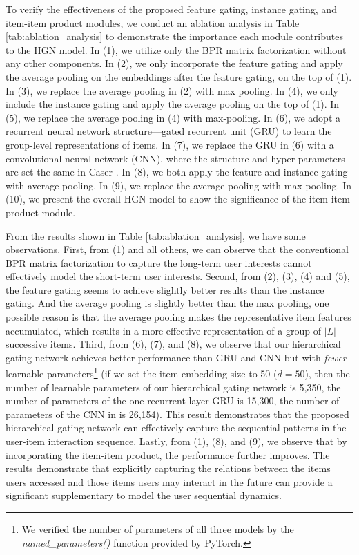 \documentclass[sigconf]{acmart}
\begin{document}
To verify the effectiveness of the proposed feature gating, instance gating, and item-item product modules, we conduct an ablation analysis in Table \ref{tab:ablation_analysis} to demonstrate the importance each module contributes to the HGN model. In (1), we utilize only the BPR matrix factorization without any other components. In (2), we only incorporate the feature gating and apply the average pooling on the embeddings after the feature gating, on the top of (1). In (3), we replace the average pooling in (2) with max pooling. In (4), we only include the instance gating and apply the average pooling on the top of (1). In (5), we replace the average pooling in (4) with max-pooling. In (6), we adopt a recurrent neural network structure---gated recurrent unit (GRU) \cite{DBLP:conf/emnlp/ChoMGBBSB14} to learn the group-level representations of items. In (7), we replace the GRU in (6) with a convolutional neural network (CNN), where the structure and hyper-parameters are set the same in Caser \cite{DBLP:conf/wsdm/TangW18}. In (8), we both apply the feature and instance gating with average pooling. In (9), we replace the average pooling with max pooling. In (10), we present the overall HGN model to show the significance of the item-item product module.

From the results shown in Table \ref{tab:ablation_analysis}, we have some observations. First, from (1) and all others, we can observe that the conventional BPR matrix factorization to capture the long-term user interests cannot effectively model the short-term user interests. Second, from (2), (3), (4) and (5), the feature gating seems to achieve slightly better results than the instance gating. And the average pooling is slightly better than the max pooling, one possible reason is that the average pooling makes the representative item features accumulated, which results in a more effective representation of a group of $ |L| $ successive items. Third, from (6), (7), and (8), we observe that our hierarchical gating network achieves better performance than GRU and CNN but with \textit{fewer} learnable parameters\footnote{We verified the number of parameters of all three models by the \textit{named\_parameters()} function provided by PyTorch.} (if we set the item embedding size to 50 ($ d = 50 $), then the number of learnable parameters of our hierarchical gating network is 5,350, the number of parameters of the one-recurrent-layer GRU is 15,300, the number of parameters of the CNN in \cite{DBLP:conf/wsdm/TangW18} is 26,154). This result demonstrates that the proposed hierarchical gating network can effectively capture the sequential patterns in the user-item interaction sequence. Lastly, from (1), (8), and (9), we observe that by incorporating the item-item product, the performance further improves. The results demonstrate that explicitly capturing the relations between the items users accessed and those items users may interact in the future can provide a significant supplementary to model the user sequential dynamics.
\end{document}
